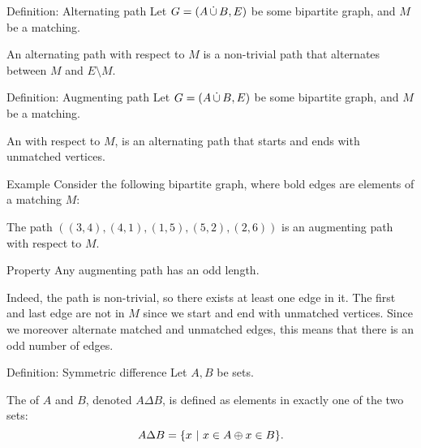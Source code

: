 \documentclass[a4paper]{article}
\begin{document}
\begin{parag}{Definition: Alternating path}
    Let $G = \left(A \dcup B, E\right)$ be some bipartite graph, and $M$ be a matching.

    An alternating path with respect to $M$ is a non-trivial path that alternates between $M$ and $E \setminus M$.
\end{parag}

\begin{parag}{Definition: Augmenting path}
    Let $G = \left(A \dcup B, E\right)$ be some bipartite graph, and $M$ be a matching.

    An  with respect to $M$, is an alternating path that starts and ends with unmatched vertices.

    \begin{subparag}{Example}
        Consider the following bipartite graph, where bold edges are elements of a matching $M$:

        The path $\left(\left(3, 4\right), \left(4, 1\right), \left(1, 5\right), \left(5, 2\right), \left(2, 6\right)\right)$ is an augmenting path with respect to $M$.
    \end{subparag}

    \begin{subparag}{Property}
        Any augmenting path has an odd length.

        Indeed, the path is non-trivial, so there exists at least one edge in it. The first and last edge are not in $M$ since we start and end with unmatched vertices. Since we moreover alternate matched and unmatched edges, this means that there is an odd number of edges. 
    \end{subparag}
\end{parag}

\begin{parag}{Definition: Symmetric difference}
    Let $A, B$ be sets. 

    The  of $A$ and $B$, denoted $A \Delta B$, is defined as elements in exactly one of the two sets: 
    \[A \Delta B = \left\{x \suchthat x \in A \oplus x \in B\right\}.\]
\end{parag}
\end{document}
